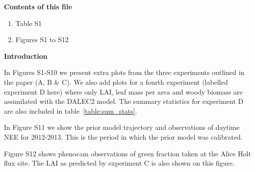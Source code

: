 \documentclass[draft,jgrga]{agutexSI}
\begin{document}
%
%

%

\begin{article}

%
%



\noindent\textbf{Contents of this file}
\begin{enumerate}
\item Table S1
\item Figures S1 to S12
\end{enumerate}


\noindent\textbf{Introduction}

In Figures S1-S10 we present extra plots from the three experiments outlined in the paper (A, B \& C). We also add plots for a fourth experiment (labelled experiment D here) where only LAI, leaf mass per area and woody biomass are assimilated with the DALEC2 model. The summary statistics for experiment D are also included in table~\ref{table:sum_stats}.

In Figure S11 we show the prior model trajectory and observations of daytime NEE for 2012-2013. This is the period in which the prior model was calibrated.

Figure S12 shows phenocam observations of green fraction taken at the Alice Holt flux site. The LAI as predicted by experiment C is also shown on this figure.

%


\end{article}
\end{document}
